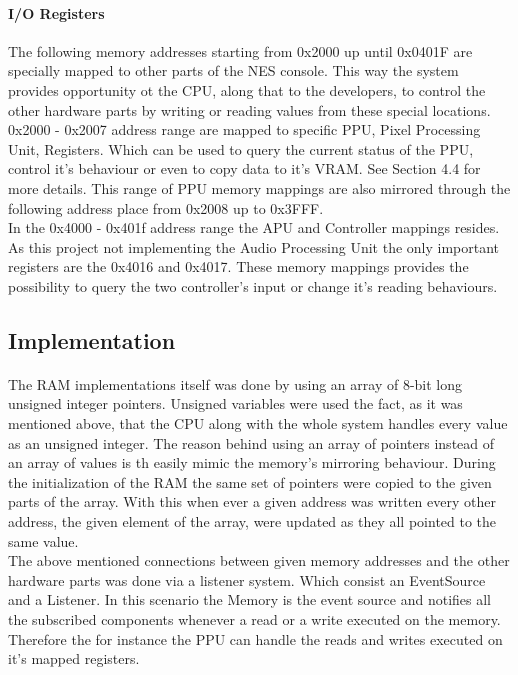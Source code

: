 \documentclass[]{report}
\begin{document}
 
 \paragraph{I/O Registers}
 The following memory addresses starting from 0x2000 up until 0x0401F are specially mapped to other parts of the NES console. This way the system provides opportunity ot the CPU, along that to the developers, to control the other hardware parts by writing or reading values from these special locations.
 \\
 0x2000 - 0x2007 address range are mapped to specific PPU, Pixel Processing Unit, Registers. Which can be used to query the current status of the PPU, control it's behaviour or even to copy data to it's VRAM. See Section 4.4 for more details.
 This range of PPU memory mappings are also mirrored through the following address place from 0x2008 up to 0x3FFF.
 \\
 In the 0x4000 - 0x401f address range the APU and Controller mappings resides. As this project not implementing the Audio Processing Unit the only important registers are the 0x4016 and 0x4017. These memory mappings provides the possibility to query the two controller's input or change it's reading behaviours.
 

\subsection{Implementation}
\paragraph{ }
The RAM implementations itself was done by using an array of 8-bit long unsigned integer pointers. Unsigned variables were used the fact, as it was mentioned above, that the CPU along with the whole system handles every value as an unsigned integer. The reason behind using an array of pointers instead of an array of values is th easily mimic the memory's mirroring behaviour. During the initialization of the RAM the same set of pointers were copied to the given parts of the array. With this when ever a given address was written every other address, the given element of the array, were updated as they all pointed to the same value.
\\
The above mentioned connections between given memory addresses and the other hardware parts was done via a listener system. Which consist an EventSource and a Listener. In this scenario the Memory is the event source and notifies all the subscribed components whenever a read or a write executed on the memory. Therefore the for instance the PPU can handle the reads and writes executed on it's mapped registers.
\end{document}
